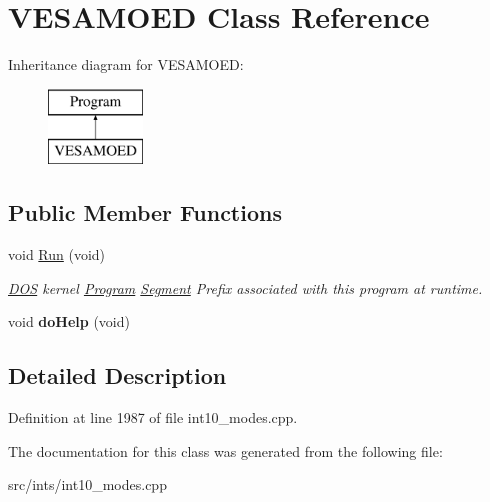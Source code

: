 \hypertarget{classVESAMOED}{\section{V\-E\-S\-A\-M\-O\-E\-D Class Reference}
\label{classVESAMOED}
}
Inheritance diagram for V\-E\-S\-A\-M\-O\-E\-D\-:\begin{figure}[H]
\begin{center}
\leavevmode
\includegraphics[height=2.000000cm]{classVESAMOED}
\end{center}
\end{figure}
\subsection*{Public Member Functions}
\begin{DoxyCompactItemize}
\item 
\hypertarget{classVESAMOED_a28a85c525cde20cbffbfbed307b1747e}{void \hyperlink{classVESAMOED_a28a85c525cde20cbffbfbed307b1747e}{Run} (void)}\label{classVESAMOED_a28a85c525cde20cbffbfbed307b1747e}

\begin{DoxyCompactList}\small\item\em \hyperlink{classDOS}{D\-O\-S} kernel \hyperlink{classProgram}{Program} \hyperlink{structSegment}{Segment} Prefix associated with this program at runtime. \end{DoxyCompactList}\item 
\hypertarget{classVESAMOED_a2c8bf90a08d8a67761958333dcbf298b}{void {\bfseries do\-Help} (void)}\label{classVESAMOED_a2c8bf90a08d8a67761958333dcbf298b}

\end{DoxyCompactItemize}


\subsection{Detailed Description}


Definition at line 1987 of file int10\-\_\-modes.\-cpp.



The documentation for this class was generated from the following file\-:\begin{DoxyCompactItemize}
\item 
src/ints/int10\-\_\-modes.\-cpp\end{DoxyCompactItemize}
